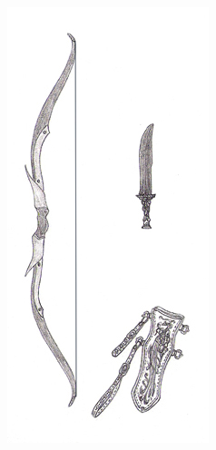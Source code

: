 \begin{figure}[b]
    \centering
    \begin{minipage}{0.3\linewidth}
    \centering
    \includegraphics[width=\textwidth]{illustrations/ragnos_endurium.jpg}

\end{minipage}
\end{figure}
